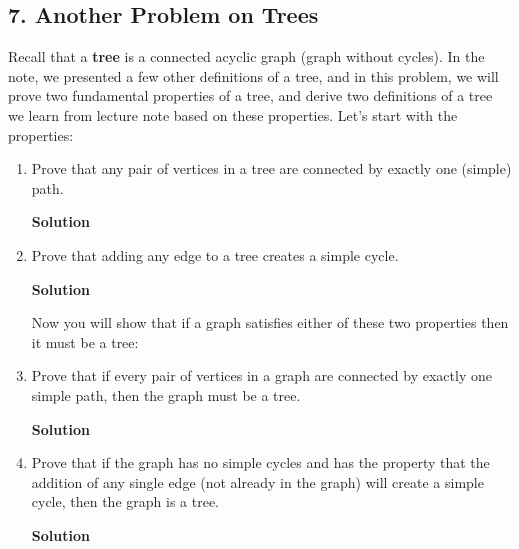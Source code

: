 \documentclass{article}
\begin{document}
\subsection*{7. Another Problem on Trees}
Recall that a \textbf{tree} is a connected acyclic graph (graph without cycles). In the note, we presented a few other definitions of a tree, and in this problem, we will prove two fundamental properties of a tree, and derive two definitions of a tree we learn from lecture note based on these properties. Let's start with the properties:
\begin{enumerate}
\item  Prove that any pair of vertices in a tree are connected by exactly one (simple) path.
\begin{mdframed}
\textbf{Solution}

\end{mdframed}
\item Prove that adding any edge to a tree creates a simple cycle.
\begin{mdframed}
\textbf{Solution}

\end{mdframed}

\begin{adjustwidth}{-0.35in}{} Now you will show that if a graph satisfies either of these two properties then it must be a tree: \end{adjustwidth}

\item Prove that if every pair of vertices in a graph are connected by exactly one simple path, then the graph must be a tree.
\begin{mdframed}
\textbf{Solution}

\end{mdframed}
\item  Prove that if the graph has no simple cycles and has the property that the addition of any single edge (not already in the graph) will create a simple cycle, then the graph is a tree.
\begin{mdframed}
\textbf{Solution}

\end{mdframed}
\end{enumerate}

\clearpage
\end{document}
